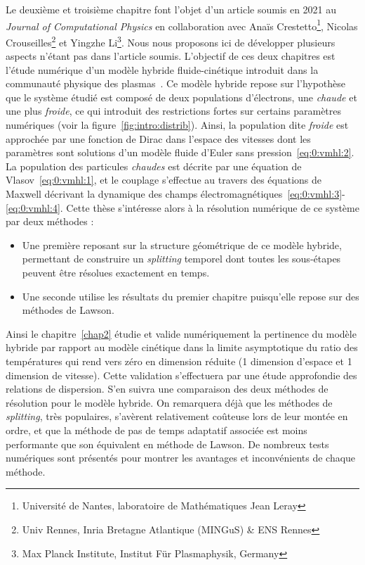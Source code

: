 Le deuxième et troisième chapitre font l'objet d'un article soumis en 2021 au \emph{Journal of Computational Physics} en collaboration avec Anaïs Crestetto\footnote{Université de Nantes, laboratoire de Mathématiques Jean Leray}, Nicolas Crouseilles\footnote{Univ Rennes, Inria Bretagne Atlantique (MINGuS) \& ENS Rennes} et Yingzhe Li\footnote{Max Planck Institute, Institut Für Plasmaphysik, Germany}. Nous nous proposons ici de développer plusieurs aspects n'étant pas dans l'article soumis. L'objectif de ces deux chapitres est l'étude numérique d'un modèle hybride fluide-cinétique introduit dans la communauté physique des plasmas~\cite{Holderied:2020}. Ce modèle hybride repose sur l'hypothèse que le système étudié est composé de deux populations d'électrons, une \emph{chaude} et une plus \emph{froide}, ce qui introduit des restrictions fortes sur certains paramètres numériques (voir la figure~\ref{fig:intro:distrib}). Ainsi, la population dite \emph{froide} est approchée par une fonction de Dirac dans l'espace des vitesses dont les paramètres sont solutions d'un modèle fluide d'Euler sans pression~\eqref{eq:0:vmhl:2}. La population des particules \emph{chaudes} est décrite par une équation de Vlasov~\eqref{eq:0:vmhl:1}, et le couplage s'effectue au travers des équations de Maxwell décrivant la dynamique des champs électromagnétiques~\eqref{eq:0:vmhl:3}-\eqref{eq:0:vmhl:4}. Cette thèse s'intéresse alors à la résolution numérique de ce système par deux méthodes :
\begin{itemize}
  \item Une première reposant sur la structure géométrique de ce modèle hybride, permettant de construire un \emph{splitting} temporel dont toutes les sous-étapes peuvent être résolues exactement en temps.
  \item Une seconde utilise les résultats du premier chapitre puisqu'elle repose sur des méthodes de Lawson.
\end{itemize}

Ainsi le chapitre~\ref{chap2} étudie et valide numériquement la pertinence du modèle hybride par rapport au modèle cinétique dans la limite asymptotique du ratio des températures qui rend vers zéro en dimension réduite (1 dimension d'espace et 1 dimension de vitesse). Cette validation s'effectuera par une étude approfondie des relations de dispersion. S'en suivra une comparaison des deux méthodes de résolution pour le modèle hybride. On remarquera déjà que les méthodes de \emph{splitting}, très populaires, s'avèrent relativement coûteuse lors de leur montée en ordre, et que la méthode de pas de temps adaptatif associée est moins performante que son équivalent en méthode de Lawson. De nombreux tests numériques sont présentés pour montrer les avantages et inconvénients de chaque méthode.

